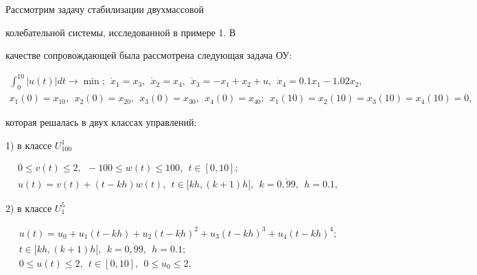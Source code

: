 \begin{exam}


Рассмотрим задачу стабилизации двухмассовой


колебательной системы, исследованной в примере 1. В


качестве сопровождающей была рассмотрена следующая задача ОУ:


\begin{gather*}


\int_{0}^{10} |u(t)| dt \to \min; \ \ \Dot x_1 = x_3, \ \ \Dot


x_2 = x_4, \ \ \Dot x_3 = -x_1 + x_2 + u, \ \ \Dot


x_4 = 0.1 x_1 - 1.02 x_2, \\


%


x_1(0) = x_{10}, \ \ x_2(0) = x_{20}, \ \ x_3(0) = x_{30}, \ \ x_4(0) =


x_{40}; \ \ x_1(10) = x_2(10) = x_3(10) =x_4(10) = 0,


\end{gather*}


которая решалась в двух классах управлений:





1) в классе $U_{100}^1$


\begin{gather*}


0 \le v(t) \le 2, \ \ -100 \le w(t) \le 100, \ \ t \in [0, 10]; \\


%


u(t) = v(t) + (t-kh)w(t), \ \ t \in [kh, (k+1)h[, \ \ k = \overline{0,


99}, \ \ h = 0.1,


\end{gather*}





2) в классе $U_1^{5}$


\begin{gather*}


u(t) = u_0 + u_1(t-kh) + u_2(t-kh)^2 + u_3(t-kh)^3 + u_4(t-kh)^4; \\


%


t \in [kh, (k+1)h[, \ \ k = \overline{0, 99}, \ \ h = 0.1; \\


%


0 \leq u(t) \leq 2, \ \ t \in [0, 10], \ \ 0 \le u_0 \le 2, \ \



\end{gather*}
\end{exam}
